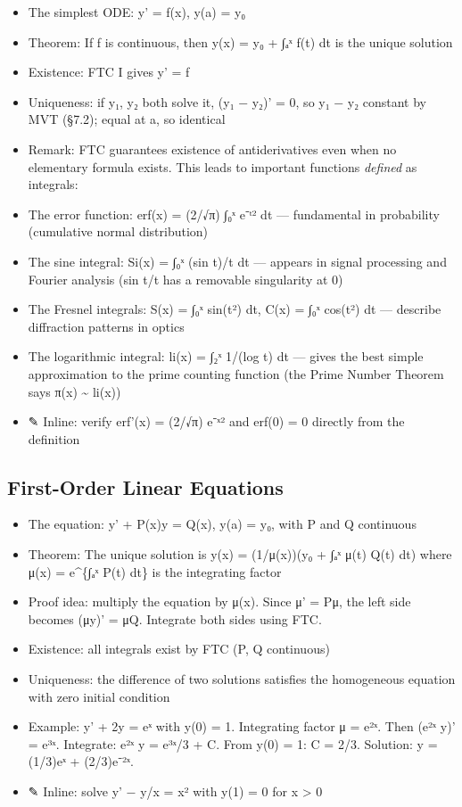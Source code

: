 \documentclass[
  10pt,
  letterpaper,
]{scrbook}
\providecommand{\tightlist}{%
  \setlength{\itemsep}{0pt}\setlength{\parskip}{0pt}}
\begin{document}
\begin{itemize}
\tightlist
\item
  The simplest ODE: y' = f(x), y(a) = y₀
\item
  Theorem: If f is continuous, then y(x) = y₀ + ∫ₐˣ f(t) dt is the
  unique solution
\item
  Existence: FTC I gives y' = f
\item
  Uniqueness: if y₁, y₂ both solve it, (y₁ − y₂)' = 0, so y₁ − y₂
  constant by MVT (§7.2); equal at a, so identical
\item
  Remark: FTC guarantees existence of antiderivatives even when no
  elementary formula exists. This leads to important functions
  \emph{defined} as integrals:
\item
  The error function: erf(x) = (2/√π) ∫₀ˣ e⁻ᵗ² dt --- fundamental in
  probability (cumulative normal distribution)
\item
  The sine integral: Si(x) = ∫₀ˣ (sin t)/t dt --- appears in signal
  processing and Fourier analysis (sin t/t has a removable singularity
  at 0)
\item
  The Fresnel integrals: S(x) = ∫₀ˣ sin(t²) dt, C(x) = ∫₀ˣ cos(t²) dt
  --- describe diffraction patterns in optics
\item
  The logarithmic integral: li(x) = ∫₂ˣ 1/(log t) dt --- gives the best
  simple approximation to the prime counting function (the Prime Number
  Theorem says π(x) \textasciitilde{} li(x))
\item
  ✎ Inline: verify erf'(x) = (2/√π) e⁻ˣ² and erf(0) = 0 directly from
  the definition
\end{itemize}

\subsection{First-Order Linear
Equations}\label{first-order-linear-equations}

\begin{itemize}
\tightlist
\item
  The equation: y' + P(x)y = Q(x), y(a) = y₀, with P and Q continuous
\item
  Theorem: The unique solution is y(x) = (1/μ(x))(y₀ + ∫ₐˣ μ(t) Q(t) dt)
  where μ(x) = e\^{}\{∫ₐˣ P(t) dt\} is the integrating factor
\item
  Proof idea: multiply the equation by μ(x). Since μ' = Pμ, the left
  side becomes (μy)' = μQ. Integrate both sides using FTC.
\item
  Existence: all integrals exist by FTC (P, Q continuous)
\item
  Uniqueness: the difference of two solutions satisfies the homogeneous
  equation with zero initial condition
\item
  Example: y' + 2y = eˣ with y(0) = 1. Integrating factor μ = e²ˣ. Then
  (e²ˣ y)' = e³ˣ. Integrate: e²ˣ y = e³ˣ/3 + C. From y(0) = 1: C = 2/3.
  Solution: y = (1/3)eˣ + (2/3)e⁻²ˣ.
\item
  ✎ Inline: solve y' − y/x = x² with y(1) = 0 for x \textgreater{} 0
\end{itemize}
\end{document}
